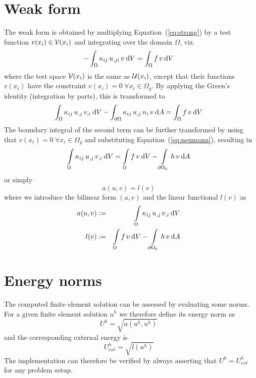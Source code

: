 \documentclass{article}
\def\dV{\:{\rm d}V}
\def\dA{\:{\rm d}A}
\begin{document}
\section{Weak form}

The weak form is obtained by multiplying Equation~(\ref{eq:strong}) by a test
function $v(x_i)\in{\cal V}(x_i)$ and integrating over the domain $\Omega$, viz.
%
\begin{equation}
  -\int_\Omega \kappa_{ij}\,u_{,ji}\,v\dV = \int_\Omega f\,v\dV
\end{equation}
%
where the test space ${\cal V}(x_i)$ is the same as ${\cal U}(x_i)$, except that
their functions $v(x_i)$ have the constraint $v(x_i)=0\;\forall x_i\in\Omega_g$.
By applying the Green's identity (integration by parts), this is transformed to
%
\begin{equation}
  \int_\Omega \kappa_{ij}\,u_{,j}\,v_{,i}\dV -
  \int_{\partial\Omega} \kappa_{ij}\,u_{,j}\,n_i\,v\dA =
  \int_\Omega f\,v\dV
\end{equation}
%
The boundary integral of the second term can be further transformed by using
that $v(x_i)=0\;\forall x_i\in\Omega_g$ and substituting
Equation~(\ref{eq:neumann}), resulting in
%
\begin{equation}
  \int\limits_\Omega \kappa_{ij}\,u_{,j}\,v_{,i}\dV =
  \int\limits_\Omega f\,v\dV -
  \int\limits_{\partial\Omega_h} h\,v\dA
\end{equation}
%
or simply
%
\begin{equation}
  a(u,v) = l(v)
\end{equation}
%
where we introduce the bilinear form $(a,v)$ and the linear functional $l(v)$ as
%
\begin{eqnarray}
  a(u,v) &:=& \int\limits_\Omega \kappa_{ij}\,u_{,j}\,v_{,i}\dV \\
  l(v)   &:=& \int\limits_\Omega f\,v\dV - \int\limits_{\partial\Omega_h}h\,v\dA
\end{eqnarray}

\section{Energy norms}

The computed finite element solution can be assessed by evaluating some norms.
For a given finite element solution $u^h$ we therefore define its energy norm as
%
\begin{equation}
  U^h = \sqrt{a(u^h,u^h)}
\end{equation}
%
and the corresponding external energy is
%
\begin{equation}
  U_{ext}^h = \sqrt{l(u^h)}
\end{equation}
%
The implementation can therefore be verified by always asserting that
$U^h=U_{ext}^h$ for any problem setup.
\end{document}
